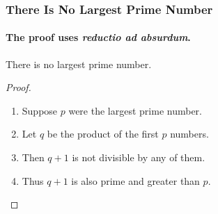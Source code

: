 \begin{frame} 
    \frametitle{There Is No Largest Prime Number} 
    \framesubtitle{The proof uses \textit{reductio ad absurdum}.} 
    \begin{theorem} There is no largest prime number. 
    \end{theorem} 
    \begin{proof} 
        \begin{enumerate} \item<1-| alert@1> Suppose $p$ were the largest prime number. 
            \item<2-> Let $q$ be the product of the first $p$ numbers. 
            \item<3-> Then $q+1$ is not divisible by any of them. 
            \item<1-> Thus $q+1$ is also prime and greater than $p$.\qedhere 
        \end{enumerate} 
    \end{proof} 
\end{frame}